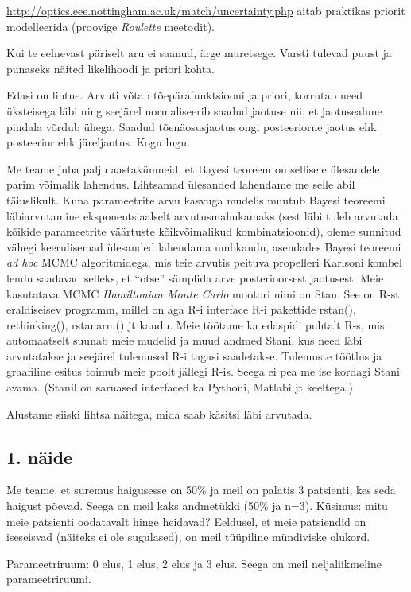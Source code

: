 \documentclass[]{book}
\begin{document}
\url{http://optics.eee.nottingham.ac.uk/match/uncertainty.php} aitab
praktikas priorit modelleerida (proovige \emph{Roulette} meetodit).

Kui te eelnevast päriselt aru ei saanud, ärge muretsege. Varsti tulevad
puust ja punaseks näited likelihoodi ja priori kohta.

Edasi on lihtne. Arvuti võtab tõepärafunktsiooni ja priori, korrutab
need üksteisega läbi ning seejärel normaliseerib saadud jaotuse nii, et
jaotusealune pindala võrdub ühega. Saadud tõenäosusjaotus ongi
posteeriorne jaotus ehk posteerior ehk järeljaotus. Kogu lugu.

Me teame juba palju aastakümneid, et Bayesi teoreem on sellisele
ülesandele parim võimalik lahendus. Lihtsamad ülesanded lahendame me
selle abil täiuslikult. Kuna parameetrite arvu kasvuga mudelis muutub
Bayesi teoreemi läbiarvutamine eksponentsiaalselt arvutusmahukamaks
(sest läbi tuleb arvutada kõikide parameetrite väärtuste kõikvõimalikud
kombinatsioonid), oleme sunnitud vähegi keerulisemad ülesanded lahendama
umbkaudu, asendades Bayesi teoreemi \emph{ad hoc} MCMC algoritmidega,
mis teie arvutis peituva propelleri Karlsoni kombel lendu saadavad
selleks, et ``otse'' sämplida arve posterioorsest jaotusest. Meie
kasutatava MCMC \emph{Hamiltonian Monte Carlo} mootori nimi on Stan. See
on R-st eraldiseisev programm, millel on aga R-i interface R-i pakettide
rstan(), rethinking(), rstanarm() jt kaudu. Meie töötame ka edaspidi
puhtalt R-s, mis automaatselt suunab meie mudelid ja muud andmed Stani,
kus need läbi arvutatakse ja seejärel tulemused R-i tagasi saadetakse.
Tulemuste töötlus ja graafiline esitus toimub meie poolt jällegi R-is.
Seega ei pea me ise kordagi Stani avama. (Stanil on sarnased interfaced
ka Pythoni, Matlabi jt keeltega.)

Alustame siiski lihtsa näitega, mida saab käsitsi läbi arvutada.

\subsection{1. näide}\label{naide}

Me teame, et suremus haigusesse on 50\% ja meil on palatis 3 patsienti,
kes seda haigust põevad. Seega on meil kaks andmetükki (50\% ja n=3).
Küsimus: mitu meie patsienti oodatavalt hinge heidavad? Eeldusel, et
meie patsiendid on iseseisvad (näiteks ei ole sugulased), on meil
tüüpiline mündiviske olukord.

Parameetriruum: 0 elus, 1 elus, 2 elus ja 3 elus. Seega on meil
neljaliikmeline parameetriruumi.
\end{document}
